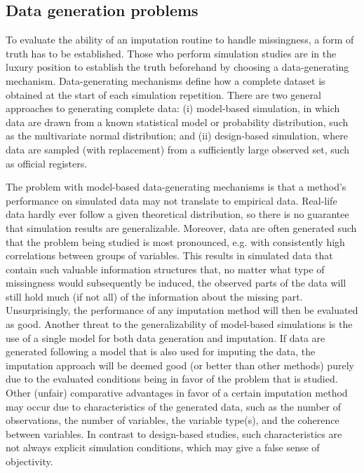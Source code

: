 \documentclass[bimj,fleqn]{w-art}
\begin{document}

\subsection{Data generation problems}

To evaluate the ability of an imputation routine to handle missingness, a form of truth has to be established. Those who perform simulation studies are in the luxury position to establish the truth beforehand by choosing a data-generating mechanism. Data-generating mechanisms define how a complete dataset is obtained at the start of each simulation repetition. There are two general approaches to generating complete data: (i) model-based simulation, in which data are drawn from a known statistical model or probability distribution, such as the multivariate normal distribution; and (ii) design-based simulation, where data are sampled (with replacement) from a sufficiently large observed set, such as official registers.

The problem with model-based data-generating mechanisms is that a method's performance on simulated data may not translate to empirical data. Real-life data hardly ever follow a given theoretical distribution, so there is no guarantee that simulation results are generalizable. Moreover, data are often generated such that the problem being studied is most pronounced, e.g. with consistently high correlations between groups of variables. This results in simulated data that contain such valuable information structures that, no matter what type of missingness would subsequently be induced, the observed parts of the data will still hold much (if not all) of the information about the missing part. Unsurprisingly, the performance of any imputation method will then be evaluated as good. Another threat to the generalizability of model-based simulations is the use of a single model for both data generation and imputation. If data are generated following a model that is also used for imputing the data, the imputation approach will be deemed good (or better than other methods) purely due to the evaluated conditions being in favor of the problem that is studied. Other (unfair) comparative advantages in favor of a certain imputation method may occur due to characteristics of the generated data, such as the number of observations, the number of variables, the variable type(s), and the coherence between variables. In contrast to design-based studies, such characteristics are not always explicit simulation conditions, which may give a false sense of objectivity.
\end{document}
